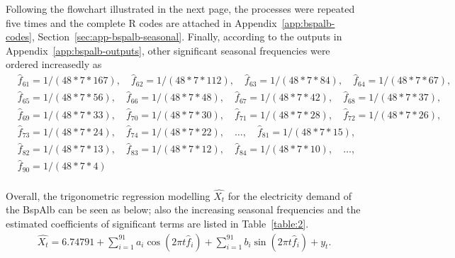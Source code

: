 \documentclass[12pt,msc]{uom_eee_dissertation_casson}
\newcommand{\tabref}[1]{Table~\ref{#1}}
\newcommand{\secref}[1]{Section~\ref{#1}}
\newcommand{\appref}[1]{Appendix~\ref{#1}}
\begin{document}
Following the flowchart illustrated in the next page, the processes were repeated five times and the complete R codes are attached in \appref{app:bspalb-codes}, \secref{sec:app-bspalb-seasonal}. Finally, according to the outputs in \appref{app:bspalb-outputs}, other significant seasonal frequencies were ordered increasedly as
\begin{equation}
\label{eq:2-6}
\begin{aligned}
&\hat{f}_{61}=1/(48*7*167),\quad\hat{f}_{62}=1/(48*7*112),\quad\hat{f}_{63}=1/(48*7*84),\quad\hat{f}_{64}=1/(48*7*67),\\
&\hat{f}_{65}=1/(48*7*56),\quad\hat{f}_{66}=1/(48*7*48),\quad\hat{f}_{67}=1/(48*7*42),\quad\hat{f}_{68}=1/(48*7*37),\\
&\hat{f}_{69}=1/(48*7*33),\quad\hat{f}_{70}=1/(48*7*30),\quad\hat{f}_{71}=1/(48*7*28),\quad\hat{f}_{72}=1/(48*7*26),\\
&\hat{f}_{73}=1/(48*7*24),\quad\hat{f}_{74}=1/(48*7*22),\quad \dots,\quad\hat{f}_{81}=1/(48*7*15),\\ &\hat{f}_{82}=1/(48*7*13),\quad\hat{f}_{83}=1/(48*7*12),\quad\hat{f}_{84}=1/(48*7*10),\quad \dots,\\ &\hat{f}_{90}=1/(48*7*4)\\
\end{aligned}
\end{equation}

Overall, the trigonometric regression modelling $\hat{X_{t}}$ for the electricity demand of the BspAlb can be seen as below; also the increasing seasonal frequencies and the estimated coefficients of significant terms are listed in \tabref{table:2}.
\begin{equation}
\label{eq:2-7}
\begin{aligned}
\hat{X_{t}}=6.74791+\sum^{91}_{i=1} a_{i}\cos(2\pi t\hat{f}_{i}) +\sum^{91}_{i=1} b_{i}\sin(2\pi t\hat{f}_{i})+y_{t}.
\end{aligned}
\end{equation}
\end{document}
